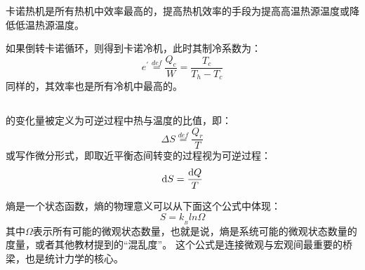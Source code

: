             卡诺热机是所有热机中效率最高的，提高热机效率的手段为提高高温热源温度或降低低温热源温度。
            
            如果倒转卡诺循环，则得到卡诺冷机，此时其制冷系数为：
            \begin{equation}
                e^{\prime} \overset{def}{=} \frac{Q_c}{W} = \frac{T_c}{T_h - T_c}
                \nonumber
            \end{equation}
            同样的，其效率也是所有冷机中最高的。
        \subsection[熵]{}
            的变化量被定义为可逆过程中热与温度的比值，即：
            \begin{equation}
                \Delta S \overset{def}{=} \frac{Q_r}{T} 
                \nonumber
            \end{equation}
            或写作微分形式，即取近平衡态间转变的过程视为可逆过程：
            \begin{equation}
                \mathrm{d}{S} = \frac{\mathrm{d}{Q}}{T} 
                \nonumber
            \end{equation}
            
            熵是一个状态函数，熵的物理意义可以从下面这个公式中体现：
            \begin{equation}
                S = k_{_B}ln\Omega
                \nonumber
            \end{equation}
            其中$\Omega$表示所有可能的微观状态数量，也就是说，熵是系统可能的微观状态数量的度量，或者其他教材提到的“混乱度”。
            这个公式是连接微观与宏观间最重要的桥梁，也是统计力学的核心。

